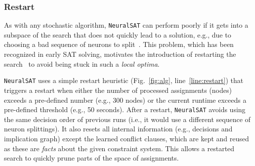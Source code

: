 \documentclass[oneside,11pt,dvipsnames]{book}
\numberwithin{equation}{section}
\theoremstyle{definition}
\theoremstyle{remark}
\newcommand{\tvn}[1]{\iftoggle{usecomment}{{\color{red}{[TVN]: #1}}}{}}
\newcommand{\hd}[1]{\iftoggle{usecomment}{{\color{blue}{[HD]: #1}}}{}}
\newcommand{\tool}{\texttt{NeuralSAT}}
\begin{document}
\subsubsection{Restart}\label{sec:restart}


As with any stochastic algorithm, \tool{} can perform poorly if it gets into a subspace of the search that does not quickly lead to a solution, e.g., due to choosing a bad sequence of neurons to split~\cite{bunel2018unified,de2021improved}.
This problem, which has been recognized in early SAT solving, motivates the introduction of restarting the search~\cite{gomes1998boosting} to avoid being stuck in such a \emph{local optima}.






\tool{} uses a simple restart heuristic (Fig.~\ref{fig:alg}, line~\ref{line:restart}) that triggers a restart when either the number of processed assignments (nodes) exceeds a pre-defined number (e.g., 300 nodes) or the current runtime exceeds a pre-defined threshold (e.g., 50 seconds).
After a restart, \tool{} avoids using the same decision order of previous runs (i.e., it would use a different sequence of neuron splittings). It also resets all internal information (e.g., decisions and implication graph) except the learned conflict clauses, which are kept and reused as these are \textit{facts} about the given constraint system.
This allows a restarted search to quickly prune parts of the  space of assignments.


\end{document}
